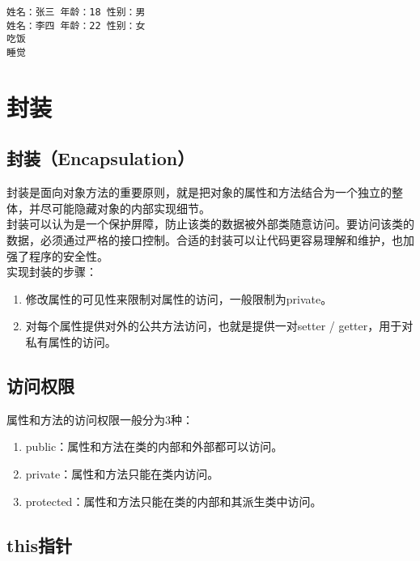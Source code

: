 \begin{tcolorbox}
	\begin{verbatim}
姓名：张三 年龄：18 性别：男
姓名：李四 年龄：22 性别：女
吃饭
睡觉
	\end{verbatim}
\end{tcolorbox}

\newpage

\section{封装}

\subsection{封装（Encapsulation）}

封装是面向对象方法的重要原则，就是把对象的属性和方法结合为一个独立的整体，并尽可能隐藏对象的内部实现细节。 \\

封装可以认为是一个保护屏障，防止该类的数据被外部类随意访问。要访问该类的数据，必须通过严格的接口控制。合适的封装可以让代码更容易理解和维护，也加强了程序的安全性。 \\

实现封装的步骤：

\begin{enumerate}
    \item 修改属性的可见性来限制对属性的访问，一般限制为private。
    \item 对每个属性提供对外的公共方法访问，也就是提供一对setter / getter，用于对私有属性的访问。
\end{enumerate}

\subsection{访问权限}

属性和方法的访问权限一般分为3种：

\begin{enumerate}
    \item public：属性和方法在类的内部和外部都可以访问。
    \item private：属性和方法只能在类内访问。
    \item protected：属性和方法只能在类的内部和其派生类中访问。
\end{enumerate}

\subsection{this指针}

